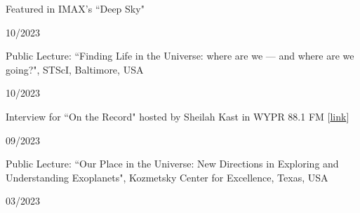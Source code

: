 \documentclass[12pt, a4paper]{article} %
\begin{document}
\vspace{0.2cm}


\begin{minipage}[t]{0.7\textwidth}
\begin{flushleft}%
  \setlength{\leftskip}{0.2cm}%
Featured in IMAX's ``Deep Sky" 
\end{flushleft}
\end{minipage}
\begin{minipage}[t]{0.3\textwidth}
\hfill 10/2023
\end{minipage}

\vspace{0.2cm}

\begin{minipage}[t]{0.7\textwidth}
\begin{flushleft}%
  \setlength{\leftskip}{0.2cm}%
Public Lecture: ``Finding Life in the Universe: where are we --- and where are we going?", STScI, Baltimore, USA
\end{flushleft}
\end{minipage}
\begin{minipage}[t]{0.3\textwidth}
\hfill 10/2023
\end{minipage}

\vspace{0.2cm}

\begin{minipage}[t]{0.7\textwidth}
\begin{flushleft}%
  \setlength{\leftskip}{0.2cm}%
Interview for ``On the Record" hosted by Sheilah Kast in WYPR 88.1 FM [\href{https://www.npr.org/podcasts/494769096/on-the-record}{link}]
\end{flushleft}
\end{minipage}
\begin{minipage}[t]{0.3\textwidth}
\hfill 09/2023
\end{minipage}

\vspace{0.2cm}

\begin{minipage}[t]{0.7\textwidth}
\begin{flushleft}%
  \setlength{\leftskip}{0.2cm}%
Public Lecture: ``Our Place in the Universe: New Directions in Exploring and Understanding Exoplanets", Kozmetsky Center for Excellence, Texas, USA
\end{flushleft}
\end{minipage}
\begin{minipage}[t]{0.3\textwidth}
\hfill 03/2023
\end{minipage}
\end{document}
